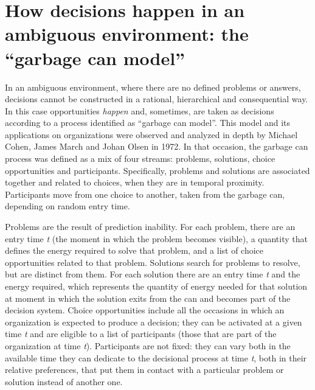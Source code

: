 \section{How decisions happen in an ambiguous environment: the ``garbage can model''}

In an ambiguous environment, where there are no defined problems or answers, decisions cannot be constructed in a rational, hierarchical and consequential way. In this case opportunities \textit{happen} and, sometimes, are taken as decisions according to a process identified as ``garbage can model''\cite{1, 2}. This model and its applications on organizations were observed and analyzed in depth by Michael Cohen, James March and Johan Olsen in 1972\cite{1}. In that occasion, the garbage can process was defined as a mix of four streams: problems, solutions, choice opportunities and participants. Specifically, problems and solutions are associated together and related to choices, when they are in temporal proximity\cite{2}. Participants move from one choice to another, taken from the garbage can, depending on random entry time.

Problems are the result of prediction inability. For each problem, there are an entry time \textit{t} (the moment in which the problem becomes visible), a quantity that defines the energy required to solve that problem, and a list of choice opportunities related to that problem. Solutions search for problems to resolve, but are distinct from them. For each solution there are an entry time \textit{t} and the energy required, which represents the quantity of energy needed for that solution at moment in which the solution exits from the can and becomes part of the decision system. Choice opportunities include all the occasions in which an organization is expected to produce a decision; they  can be activated at a given time \textit{t} and are eligible to a list of participants (those that are part of the organization at time \textit{t}). Participants are not fixed: they can vary both in the available time they can dedicate to the decisional process at time \textit{t}, both in their relative preferences, that put them in contact with a particular problem or solution instead of another one\cite{1}.


